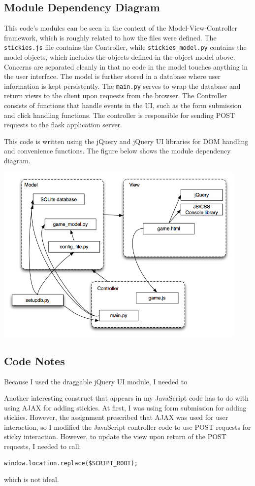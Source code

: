 \documentclass[11pt,letterpaper]{article}
\begin{document}
\subsection{Module Dependency Diagram}
This code's modules can be seen in the context of the Model-View-Controller framework, which is roughly related to how the files were defined. The \texttt{stickies.js} file contains the Controller, while \texttt{stickies\_model.py} contains the model objects, which includes the objects defined in the object model above. Concerns are separated cleanly in that no code in the model touches anything in the user interface. The model is further stored in a database where user information is kept persistently. The \texttt{main.py} serves to wrap the database and return views to the client upon requests from the browser. The Controller consists of functions that handle events in the UI, such as the form submission and click handling functions. The controller is responsible for sending POST requests to the flask application server.

This code is written using the jQuery and jQuery UI libraries for DOM handling and convenience functions. The figure below shows the module dependency diagram.

\begin{center}
\includegraphics[width=350pt]{dot/moddep.png}
\label{fig:ob2} 
\end{center}
\subsection{Code Notes}
Because I used the draggable jQuery UI module, I needed to 

Another interesting construct that appears in my JavaScript code has to do with using AJAX for adding stickies. At first, I was using form submission for adding stickies. However, the assignment prescribed that AJAX was used for user interaction, so I modified the JavaScript controller code to use POST requests for sticky interaction. However, to update the view upon return of the POST requests, I needed to call:
\begin{verbatim}
window.location.replace($SCRIPT_ROOT);
\end{verbatim}
which is not ideal.
\end{document}
